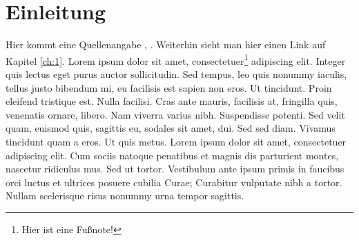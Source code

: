 \chapter{Einleitung}

Hier kommt eine Quellenangabe \cite{Gray1981}, \cite{docker:daemon}. Weiterhin sieht man hier einen Link auf Kapitel \ref{ch:1}.
Lorem ipsum dolor sit amet, consectetuer\footnote{Hier ist eine Fußnote!} adipiscing elit. Integer quis lectus eget purus auctor sollicitudin.
Sed tempus, leo quis nonummy iaculis, tellus justo bibendum mi, eu facilisis est sapien non eros. Ut tincidunt. Proin eleifend tristique est.
Nulla facilisi. Cras ante mauris, facilisis at, fringilla quis, venenatis ornare, libero. Nam viverra varius nibh. Suspendisse potenti.
Sed velit quam, euismod quis, sagittis eu, sodales sit amet, dui. Sed sed diam. Vivamus tincidunt quam a eros. Ut quis metus.
Lorem ipsum dolor sit amet, consectetuer adipiscing elit. Cum sociis natoque penatibus et magnis dis parturient montes, nascetur ridiculus mus.
Sed ut tortor. Vestibulum ante ipsum primis in faucibus orci luctus et ultrices posuere cubilia Curae; Curabitur vulputate nibh a tortor.
Nullam scelerisque risus nonummy urna tempor sagittis.
